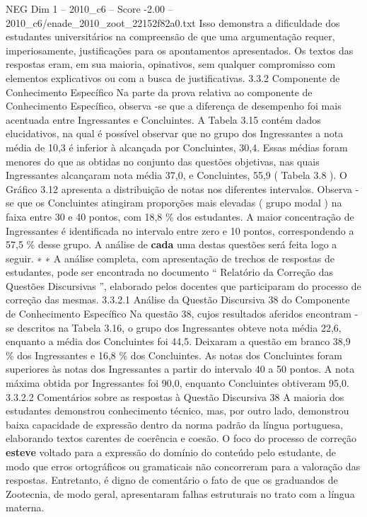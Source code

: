 \begin{textsample}{NEG Dim 1 – 2010\_c6 – Score -2.00 – 2010\_c6/enade\_2010\_zoot\_22152f82a0.txt}
Isso demonstra a dificuldade dos estudantes universitários na compreensão de que uma argumentação requer, imperiosamente, justificações para os apontamentos apresentados.
Os textos das respostas eram, em sua maioria, opinativos, sem qualquer compromisso com elementos explicativos ou com a busca de justificativas. 3.3.2 Componente de Conhecimento Específico Na parte da prova relativa ao componente de Conhecimento Específico, observa -se que a diferença de desempenho foi mais acentuada entre Ingressantes e Concluintes.
A Tabela 3.15 contém dados elucidativos, na qual é possível observar que no grupo dos Ingressantes a nota média de 10,3 é inferior à alcançada por Concluintes, 30,4.
Essas médias foram menores do que as obtidas no conjunto das questões objetivas, nas quais Ingressantes alcançaram nota média 37,0, e Concluintes, 55,9 ( Tabela 3.8 ).
O Gráfico 3.12 apresenta a distribuição de notas nos diferentes intervalos.
Observa -se que os Concluintes atingiram proporções mais elevadas ( grupo modal ) na faixa entre 30 e 40 pontos, com 18,8 \% dos estudantes.
A maior concentração de Ingressantes é identificada no intervalo entre zero e 10 pontos, correspondendo a 57,5 \% desse grupo.
A análise de \textbf{cada} uma destas questões será feita logo a seguir. ∗ ∗ A análise completa, com apresentação de trechos de respostas de estudantes, pode ser encontrada no documento “ Relatório da Correção das Questões Discursivas ”, elaborado pelos docentes que participaram do processo de correção das mesmas. 3.3.2.1 Análise da Questão Discursiva 38 do Componente de Conhecimento Específico Na questão 38, cujos resultados aferidos encontram -se descritos na Tabela 3.16, o grupo dos Ingressantes obteve nota média 22,6, enquanto a média dos Concluintes foi 44,5.
Deixaram a questão em branco 38,9 \% dos Ingressantes e 16,8 \% dos Concluintes.
As notas dos Concluintes foram superiores às notas dos Ingressantes a partir do intervalo 40 a 50 pontos.
A nota máxima obtida por Ingressantes foi 90,0, enquanto Concluintes obtiveram 95,0. 3.3.2.2 Comentários sobre as respostas à Questão Discursiva 38 A maioria dos estudantes demonstrou conhecimento técnico, mas, por outro lado, demonstrou baixa capacidade de expressão dentro da norma padrão da língua portuguesa, elaborando textos carentes de coerência e coesão.
O foco do processo de correção \textbf{esteve} voltado para a expressão do domínio do conteúdo pelo estudante, de modo que erros ortográficos ou gramaticais não concorreram para a valoração das respostas.
Entretanto, é digno de comentário o fato de que os graduandos de Zootecnia, de modo geral, apresentaram falhas estruturais no trato com a língua materna.

\end{textsample}
